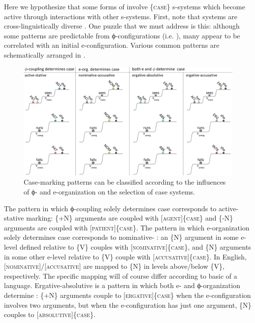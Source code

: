   Here we hypothesize that some forms of  involve \{\textsc{case}\} s-systems which become active through interactions with other s-systems. First, note that  systems are cross-linguistically diverse \citep{MalchukovSpencer2008}. One puzzle that we must address is this: although some  patterns are predictable from ϕ-configurations (i.e. ), many appear to be correlated with an initial e-configuration. Various common  patterns are schematically arranged in {}. 

  
\begin{figure}
\includegraphics[width=\textwidth]{figures/Tilsen-img70.png}
\caption{Case-marking patterns can be classified according to the influences of ϕ- and e-organization on the selection of case systems.}
\label{fig:4:20}
\end{figure}
 

  The pattern in which ϕ-coupling solely determines case corresponds to active-stative marking: \{+N\} arguments are coupled with [\textsc{agent}]\{\textsc{case}\} and \{-N\} arguments are coupled with [\textsc{patient}]\{\textsc{case}\}. The pattern in which e-organization solely determines case corresponds to nominative- : an \{N\} argument in some e-level defined relative to \{V\} couples with [\textsc{nominative}]\{\textsc{case}\}, and \{N\} arguments in some other e-level relative to \{V\} couple with [\textsc{accusative}]\{\textsc{case\}}. In English, [\textsc{nominative}]/[\textsc{accusative}] are mapped to \{N\} in levels above/below \{V\}, respectively. The specific mapping will of course differ according to basic  of a language. Ergative-absolutive is a pattern in which both e- and ϕ-organization determine : \{+N\} arguments couple to [\textsc{ergative}]\{\textsc{case}\} when the e-configuration involves two arguments, but when the e-configuration has just one argument, \{N\} couples to [\textsc{absolutive}]\{\textsc{case}\}.

